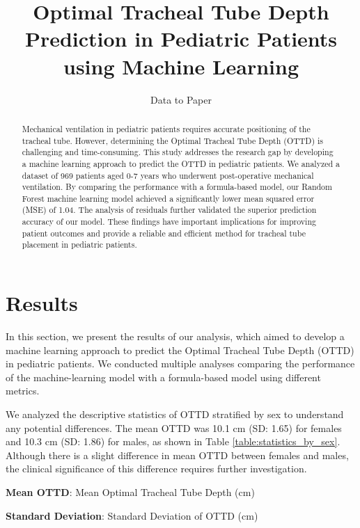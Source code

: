 \documentclass[11pt]{article}
\title{Optimal Tracheal Tube Depth Prediction in Pediatric Patients using Machine Learning}
\author{Data to Paper}
\begin{document}
\maketitle
\begin{abstract}
Mechanical ventilation in pediatric patients requires accurate positioning of the tracheal tube. However, determining the Optimal Tracheal Tube Depth (OTTD) is challenging and time-consuming. This study addresses the research gap by developing a machine learning approach to predict the OTTD in pediatric patients. We analyzed a dataset of 969 patients aged 0-7 years who underwent post-operative mechanical ventilation. By comparing the performance with a formula-based model, our Random Forest machine learning model achieved a significantly lower mean squared error (MSE) of 1.04. The analysis of residuals further validated the superior prediction accuracy of our model. These findings have important implications for improving patient outcomes and provide a reliable and efficient method for tracheal tube placement in pediatric patients. 
\end{abstract}
\section*{Results}

In this section, we present the results of our analysis, which aimed to develop a machine learning approach to predict the Optimal Tracheal Tube Depth (OTTD) in pediatric patients. We conducted multiple analyses comparing the performance of the machine-learning model with a formula-based model using different metrics.

We analyzed the descriptive statistics of OTTD stratified by sex to understand any potential differences. The mean OTTD was 10.1 cm (SD: 1.65) for females and 10.3 cm (SD: 1.86) for males, as shown in Table {}\ref{table:statistics_by_sex}. Although there is a slight difference in mean OTTD between females and males, the clinical significance of this difference requires further investigation.

\begin{table}[h]
\caption{Descriptive statistics of Optimal Tracheal Tube Depth (OTTD) stratified by sex}
\label{table:statistics_by_sex}
\begin{threeparttable}
\renewcommand{\TPTminimum}{\linewidth}
\begin{tablenotes}
\footnotesize
\item \textbf{Mean OTTD}: Mean Optimal Tracheal Tube Depth (cm)
\item \textbf{Standard Deviation}: Standard Deviation of OTTD (cm)
\end{tablenotes}
\end{threeparttable}
\end{table}
\end{document}
